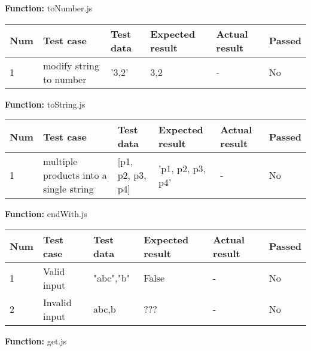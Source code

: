 \documentclass[a4paper, 12pt]{article}
\begin{document}
        \textbf{Function:} toNumber.js
        
        \begin{table}[h!]
            \begin{tabular}{|l|l|l|l|l|l|}
                \hline
                Num & Test case        					& Test data 					& Expected result 					& Actual result 		& Passed \\ \hline
                1   & modify string to number 			& '3,2'     					& 3,2               				& -             		& No     \\ \hline
            \end{tabular}
        \end{table}
    
    \newpage
    
        \textbf{Function:} toString.js
        
        \begin{table}[h!]
            \begin{tabular}{|l|l|l|l|l|l|}
                \hline
                Num & Test case        										& Test data 					& Expected result 					& Actual result 		& Passed \\ \hline
                1   & multiple products into a single string 				& {[}p1, p2, p3, p4{]}     		& 'p1, p2, p3, p4'                	& -             		& No     \\ \hline
            \end{tabular}
        \end{table}
    
        \textbf{Function:} endWith.js
        
        \begin{table}[h!]
            \begin{tabular}{|l|l|l|l|l|l|}
                \hline
                Num & Test case        					& Test data 					& Expected result 					& Actual result 		& Passed \\ \hline
                1   & Valid input 						& "abc","b"      				& False                				& -             		& No     \\ \hline
                2   & Invalid input 					& abc,b     					& ???               				& -             		& No     \\ \hline
            \end{tabular}
        \end{table}
    
        \textbf{Function:} get.js
        
\end{document}
